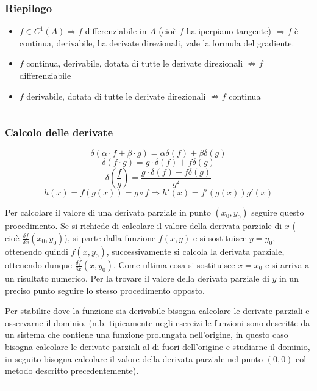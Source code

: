 \subsubsection*{Riepilogo}
\begin{itemize}
    \item $f \in C^1(A) \Rightarrow f$ differenziabile in $A$ (cioè $f$ ha iperpiano tangente) $\Rightarrow f$ è continua, derivabile, ha derivate direzionali, vale la formula del gradiente.
    \item $f$ continua, derivabile, dotata di tutte le derivate direzionali $\nRightarrow f$ differenziabile
    \item $f$ derivabile, dotata di tutte le derivate direzionali $\nRightarrow f$ continua 
\end{itemize}
\rule{\textwidth}{0.4pt}
\subsubsection*{Calcolo delle derivate}
\[
    \delta(\alpha \cdot f + \beta \cdot g) = \alpha \delta(f) + \beta \delta (g)
\]
\[
    \delta(f \cdot  g) = g \cdot \delta(f) + f \delta(g)
\]
\[
    \delta(\frac{f}{g}) = \frac{ g \cdot \delta(f) - f \delta(g)}{g^2}
\]
\[
    h(x) = f(g(x)) = g \circ f \Rightarrow h'(x) = f'(g(x)) g'(x)
\]

Per calcolare il valore di una derivata parziale in punto $(x_0, y_0)$ seguire questo procedimento. Se si richiede di calcolare il valore della derivata parziale di $x$ ( cioè $\frac{\delta f}{\delta x}(x_0,y_0)$), si parte dalla funzione $f(x,y)$ e si sostituisce $y= y_0$, ottenendo quindi $f(x,y_0)$, successivamente si calcola la derivata parziale, ottenendo dunque $\frac{\delta f}{\delta x} (x,y_0)$. Come ultima cosa si sostituisce $x = x_0$ e si arriva a un risultato numerico. Per la trovare il valore della derivata parziale di $y$ in un preciso punto seguire lo stesso procedimento opposto.\newline

Per stabilire dove la funzione sia derivabile bisogna calcolare le derivate parziali e osservarne il dominio.\newline
(n.b. tipicamente negli esercizi le funzioni sono descritte da un sistema che contiene una funzione prolungata nell'origine, in questo caso bisogna calcolare le derivate parziali al di fuori dell'origine e studiarne il dominio, in seguito bisogna calcolare il valore della derivata parziale nel punto $(0,0)$ col metodo descritto precedentemente).\newline
\rule{\textwidth}{0.4pt}
